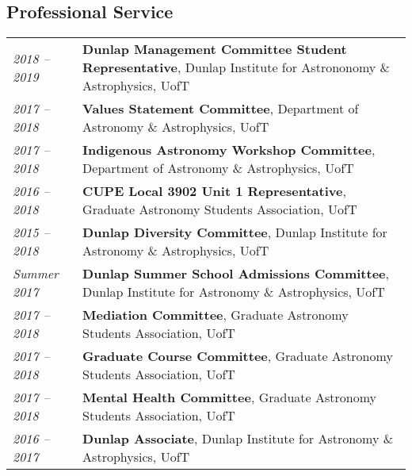 \documentclass[10pt]{res} %
\begin{document}
\begin{resume}

\section{\Large Professional Service}
\vspace{-5pt} %
\noindent\makebox[\linewidth]{\rule{\textwidth}{0.4pt}}
\vspace{-20pt} %

\begin{table}[h]
\begin{tabularx}{\textwidth}{lX}
\textit{2018 -- 2019} & \textbf{Dunlap Management Committee Student Representative}, Dunlap Institute for Astrononomy \& Astrophysics, UofT \\
\textit{2017 -- 2018} & \textbf{Values Statement Committee}, Department of Astronomy \& Astrophysics, UofT \\
\textit{2017 -- 2018} & \textbf{Indigenous Astronomy  Workshop Committee}, Department of Astronomy \& Astrophysics, UofT \\
\textit{2016 --  2018} & \textbf{CUPE Local 3902 Unit 1 Representative}, Graduate Astronomy Students Association, UofT \\
\textit{2015 --  2018} & \textbf{Dunlap Diversity Committee}, Dunlap Institute for Astronomy \& Astrophysics, UofT \\
\textit{Summer 2017} & \textbf{Dunlap Summer School Admissions Committee}, Dunlap Institute for Astronomy \& Astrophysics, UofT \\
\textit{2017 -- 2018} & \textbf{Mediation Committee}, Graduate Astronomy Students Association, UofT \\
\textit{2017 -- 2018} & \textbf{Graduate Course Committee}, Graduate Astronomy Students Association, UofT \\
\textit{2017 -- 2018} & \textbf{Mental Health Committee}, Graduate Astronomy Students Association, UofT \\
\textit{2016 --  2017} & \textbf{Dunlap Associate}, Dunlap Institute for Astronomy \& Astrophysics, UofT
\end{tabularx}
\end{table}


\end{resume}
\end{document}

